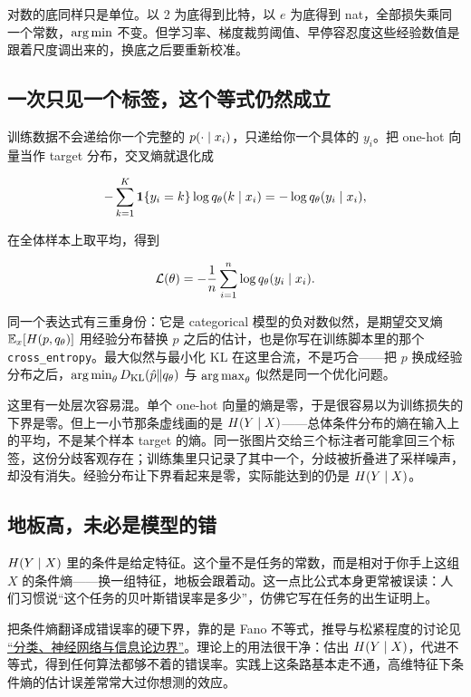 对数的底同样只是单位。以 2 为底得到比特，以 \(e\) 为底得到 nat，全部损失乘同一个常数，\(\operatorname*{arg\,min}\) 不变。但学习率、梯度裁剪阈值、早停容忍度这些经验数值是跟着尺度调出来的，换底之后要重新校准。

\subsection{一次只见一个标签，这个等式仍然成立}

训练数据不会递给你一个完整的 \(p(\cdot\mid x_i)\)，只递给你一个具体的 \(y_i\)。把 one-hot 向量当作 target 分布，交叉熵就退化成

\[
-\sum_{k=1}^K\mathbf{1}\{y_i=k\}\log q_\theta(k\mid x_i)
=-\log q_\theta(y_i\mid x_i),
\]

在全体样本上取平均，得到

\[
\mathcal L(\theta)=-\frac1n\sum_{i=1}^n\log q_\theta(y_i\mid x_i).
\]

同一个表达式有三重身份：它是 categorical 模型的负对数似然，是期望交叉熵 \(\mathbb{E}_x[H(p,q_\theta)]\) 用经验分布替换 \(p\) 之后的估计，也是你写在训练脚本里的那个 \texttt{cross\_entropy}。最大似然与最小化 KL 在这里合流，不是巧合——把 \(p\) 换成经验分布之后，\(\operatorname*{arg\,min}_\theta D_{\mathrm{KL}}(\hat p\|q_\theta)\) 与 \(\operatorname*{arg\,max}_\theta\) 似然是同一个优化问题。

这里有一处层次容易混。单个 one-hot 向量的熵是零，于是很容易以为训练损失的下界是零。但上一小节那条虚线画的是 \(H(Y\mid X)\)——总体条件分布的熵在输入上的平均，不是某个样本 target 的熵。同一张图片交给三个标注者可能拿回三个标签，这份分歧客观存在；训练集里只记录了其中一个，分歧被折叠进了采样噪声，却没有消失。经验分布让下界看起来是零，实际能达到的仍是 \(H(Y\mid X)\)。

\subsection{地板高，未必是模型的错}

\(H(Y\mid X)\) 里的条件是给定特征。这个量不是任务的常数，而是相对于你手上这组 \(X\) 的条件熵——换一组特征，地板会跟着动。这一点比公式本身更常被误读：人们习惯说``这个任务的贝叶斯错误率是多少''，仿佛它写在任务的出生证明上。

把条件熵翻译成错误率的硬下界，靠的是 Fano 不等式，推导与松紧程度的讨论见 \hyperref[sec:07-Information-Theory/06-Information-and-Learning/04]{``分类、神经网络与信息论边界''}。理论上的用法很干净：估出 \(H(Y\mid X)\)，代进不等式，得到任何算法都够不着的错误率。实践上这条路基本走不通，高维特征下条件熵的估计误差常常大过你想测的效应。

